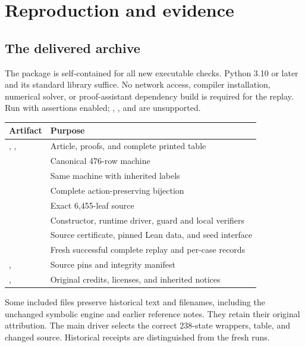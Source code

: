 \section{Reproduction and evidence}
\label{sec:reproduce}

\subsection{The delivered archive}

The package is self-contained for all new executable checks.
Python 3.10 or later and its standard library suffice.
No network access, compiler installation, numerical solver,
or proof-assistant dependency build is required for the
replay. Run with assertions enabled; ,
, and  are unsupported.

\begin{center}
\small
\begin{tabular}{@{}L{0.47\textwidth}L{0.45\textwidth}@{}}
\toprule
Artifact & Purpose\\
\midrule
{}, , 
& Article, proofs, and complete printed table\\
& Canonical 476-row machine\\
& Same machine with inherited labels\\
& Complete action-preserving bijection\\
& Exact 6,455-leaf source\\
& Constructor, runtime driver, guard and local verifiers\\
& Source certificate, pinned Lean data, and seed interface\\
& Fresh successful complete replay and per-case records\\
, 
& Source pins and integrity manifest\\
, 
& Original credits, licenses, and inherited notices\\
\bottomrule
\end{tabular}
\end{center}

Some included files preserve historical text and filenames,
including the unchanged symbolic engine and earlier reference
notes. They retain their original attribution. The main
driver selects the correct 238-state wrappers, table,
and changed source. Historical receipts are distinguished
from the fresh runs.

